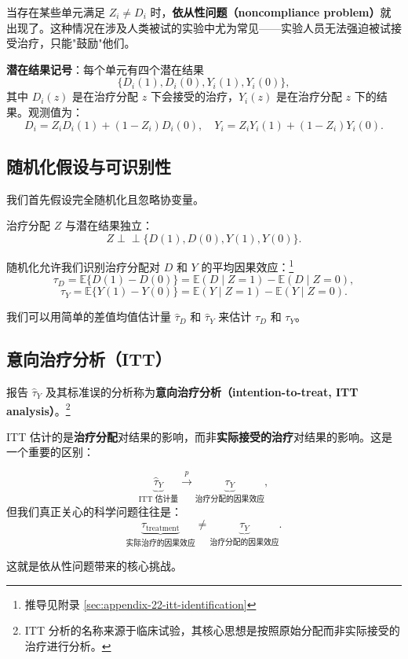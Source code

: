 当存在某些单元满足 $Z_i \neq D_i$ 时，\textbf{依从性问题（noncompliance problem）}就出现了。这种情况在涉及人类被试的实验中尤为常见——实验人员无法强迫被试接受治疗，只能"鼓励"他们。

\textbf{潜在结果记号}：每个单元有四个潜在结果
\[
\{D_i(1), D_i(0), Y_i(1), Y_i(0)\},
\]
其中 $D_i(z)$ 是在治疗分配 $z$ 下会接受的治疗，$Y_i(z)$ 是在治疗分配 $z$ 下的结果。观测值为：
\[
D_i = Z_i D_i(1) + (1 - Z_i) D_i(0), \quad Y_i = Z_i Y_i(1) + (1 - Z_i) Y_i(0).
\]

\subsection{随机化假设与可识别性}

我们首先假设完全随机化且忽略协变量。

\begin{Assumption}[随机化]\label{asm:22-randomization}
治疗分配 $Z$ 与潜在结果独立：
\[
Z \perp\!\!\!\perp \{D(1), D(0), Y(1), Y(0)\}.
\]
\end{Assumption}

随机化允许我们识别治疗分配对 $D$ 和 $Y$ 的平均因果效应：\footnote{推导见附录 \cref{sec:appendix-22-itt-identification}}
\[
\tau_D = \mathbb{E}\{D(1) - D(0)\} = \mathbb{E}(D \mid Z = 1) - \mathbb{E}(D \mid Z = 0),
\]
\[
\tau_Y = \mathbb{E}\{Y(1) - Y(0)\} = \mathbb{E}(Y \mid Z = 1) - \mathbb{E}(Y \mid Z = 0).
\]

我们可以用简单的差值均值估计量 $\hat\tau_D$ 和 $\hat\tau_Y$ 来估计 $\tau_D$ 和 $\tau_Y$。

\subsection{意向治疗分析（ITT）}

报告 $\hat\tau_Y$ 及其标准误的分析称为\textbf{意向治疗分析（intention-to-treat, ITT analysis）}。\footnote{ITT 分析的名称来源于临床试验，其核心思想是按照原始分配而非实际接受的治疗进行分析。}

ITT 估计的是\textbf{治疗分配}对结果的影响，而非\textbf{实际接受的治疗}对结果的影响。这是一个重要的区别：

\[
\underbrace{\hat\tau_Y}_{\text{ITT 估计量}} \xrightarrow{p} \underbrace{\tau_Y}_{\text{治疗分配的因果效应}},
\]
但我们真正关心的科学问题往往是：
\[
\underbrace{\tau_{\text{treatment}}}_{\text{实际治疗的因果效应}} \neq \underbrace{\tau_Y}_{\text{治疗分配的因果效应}}.
\]

这就是依从性问题带来的核心挑战。

